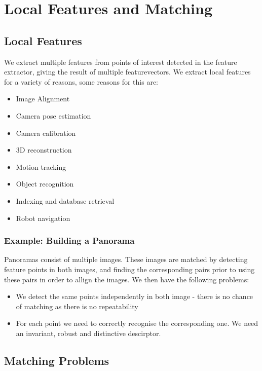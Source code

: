 \section{Local Features and Matching}

\subsection{Local Features}

We extract multiple features from points of interest detected in the feature extractor, giving the result of multiple featurevectors. We extract local features for a variety of reasons, some reasons for this are:

\begin{itemize}
    \itemsep0em
    \item Image Alignment
    \item Camera pose estimation
    \item Camera calibration
    \item 3D reconstruction
    \item Motion tracking
    \item Object recognition
    \item Indexing and database retrieval
    \item Robot navigation
\end{itemize}

\subsubsection{Example: Building a Panorama}

Panoramas consist of multiple images. These images are matched by detecting feature points in both images, and finding the corresponding pairs prior to using these pairs in order to allign the images. We then have the following problems:

\begin{itemize}
    \itemsep0em
    \item We detect the same points independently in both image - there is no chance of matching as there is no repeatability
    \item For each point we need to correctly recognise the corresponding one. We need an invariant, robust and distinctive descirptor.
\end{itemize}

\subsection{Matching Problems}

